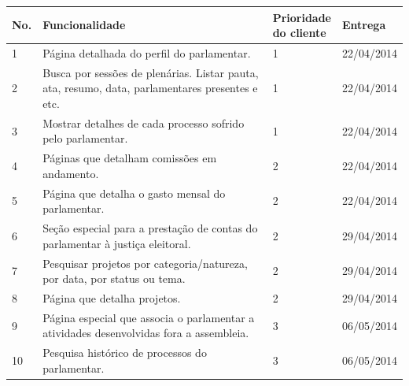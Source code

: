 \documentclass[12pt, a4paper]{article}
\begin{document}
    \begin{longtabu}{X[-1, r] | X | X[-1, r] | X[-1]}
            \hline
            \textbf{No.} &
            \textbf{Funcionalidade} &
            \textbf{Prioridade \newline do cliente} &
            \textbf{Entrega}
            \\ \hline

            1 &
            Página detalhada do perfil do parlamentar. &
            1 & 22/04/2014
            \\ \hline

            2 &
            Busca por sessões de plenárias. Listar pauta, ata, resumo, data,
            parlamentares presentes e etc. &
            1 & 22/04/2014
            \\ \hline

            3 &
            Mostrar detalhes de cada processo sofrido pelo parlamentar. &
            1 & 22/04/2014
            \\ \hline

            4 &
            Páginas que detalham comissões em andamento. &
            2 & 22/04/2014
            \\ \hline

            5 &
            Página que detalha o gasto mensal do parlamentar.
            & 2 & 22/04/2014
            \\ \hline

            6 &
            Seção especial para a prestação de contas do parlamentar à justiça
            eleitoral. &
            2 & 29/04/2014
            \\ \hline

            7  &
            Pesquisar projetos por categoria/natureza, por data, por status ou
            tema. &
            2 & 29/04/2014
            \\ \hline

            8  &
            Página que detalha projetos. &
            2 & 29/04/2014
            \\ \hline

            9  &
            Página especial que associa o parlamentar a atividades
            desenvolvidas fora a assembleia. &
            3 & 06/05/2014
            \\ \hline

            10 &
            Pesquisa histórico de processos do parlamentar. &
            3 & 06/05/2014
            \\ \hline


\end{longtabu}
\end{document}
